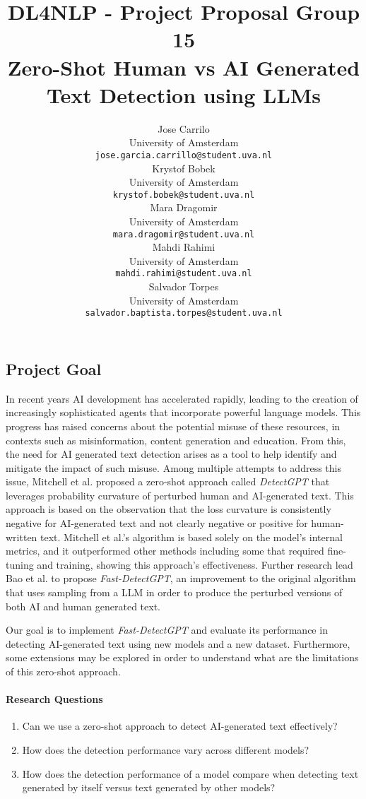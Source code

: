 \documentclass{article}
\title{DL4NLP - Project Proposal Group 15 \\ Zero-Shot Human vs AI Generated Text Detection using LLMs}
\author{%
    Jose Carrilo \\
    University of Amsterdam\\
    \texttt{jose.garcia.carrillo@student.uva.nl} \\
    \And
    Krystof Bobek \\
    University of Amsterdam\\
    \texttt{krystof.bobek@student.uva.nl} \\
    \And
    Mara Dragomir \\
    University of Amsterdam\\
    \texttt{mara.dragomir@student.uva.nl} \\
    \And
    Mahdi Rahimi \\
    University of Amsterdam\\
    \texttt{mahdi.rahimi@student.uva.nl} \\
    \And
    Salvador Torpes \\
    University of Amsterdam\\
    \texttt{salvador.baptista.torpes@student.uva.nl} \\
}
\begin{document}
\maketitle



\subsection*{Project Goal}

In recent years AI development has accelerated rapidly, leading to the creation of increasingly sophisticated agents that incorporate powerful language models. This progress has raised concerns about the potential misuse of these resources, in contexts such as misinformation, content generation and education. From this, the need for AI generated text detection arises as a tool to help identify and mitigate the impact of such misuse. Among multiple attempts to address this issue, Mitchell et al.\cite{detectgpt} proposed a zero-shot approach called \textit{DetectGPT} that leverages probability curvature of perturbed human and AI-generated text. This approach is based on the observation that the loss curvature is consistently negative for AI-generated text and not clearly negative or positive for human-written text. Mitchell et al.'s \cite{detectgpt} algorithm is based solely on the model's internal metrics, and it outperformed other methods including some that required fine-tuning and training, showing this approach's effectiveness. Further research lead Bao et al.\cite{fastdetectgpt} to propose \textit{Fast-DetectGPT}, an improvement to the original algorithm that uses sampling from a LLM in order to produce the perturbed versions of both AI and human generated text.

Our goal is to implement \textit{Fast-DetectGPT} and evaluate its performance in detecting AI-generated text using new models and a new dataset. Furthermore, some extensions may be explored in order to understand what are the limitations of this zero-shot approach. 

\paragraph{Research Questions}

\begin{enumerate}
  \item Can we use a zero-shot approach to detect AI-generated text effectively?
  \item How does the detection performance vary across different models?
  \item How does the detection performance of a model compare when detecting text generated by itself versus text generated by other models?
\end{enumerate}
\end{document}
